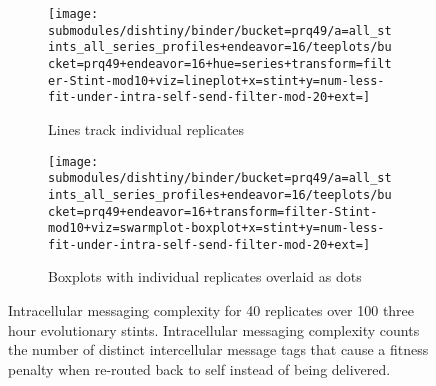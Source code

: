 \begin{figure}
\begin{center}

\begin{subfigure}[b]{\textwidth}
\centering
\texttt{[image: submodules/dishtiny/binder/bucket=prq49/a=all\_stints\_all\_series\_profiles+endeavor=16/teeplots/bucket=prq49+endeavor=16+hue=series+transform=filter-Stint-mod10+viz=lineplot+x=stint+y=num-less-fit-under-intra-self-send-filter-mod-20+ext=]}%
\caption{
Lines track individual replicates
}
\label{fig:intra-messaging-complexity-vs-stint-lineplot}
\end{subfigure}

\begin{subfigure}[b]{\columnwidth}
\centering
\texttt{[image: submodules/dishtiny/binder/bucket=prq49/a=all\_stints\_all\_series\_profiles+endeavor=16/teeplots/bucket=prq49+endeavor=16+transform=filter-Stint-mod10+viz=swarmplot-boxplot+x=stint+y=num-less-fit-under-intra-self-send-filter-mod-20+ext=]}
\caption{
Boxplots with individual replicates overlaid as dots
}
\label{fig:intra-messaging-complexity-vs-stint-boxplot}
\end{subfigure}

\caption{
Intracellular messaging complexity for 40 replicates over 100 three hour evolutionary stints.
Intracellular messaging complexity counts the number of distinct intercellular message tags that cause a fitness penalty when re-routed back to self instead of being delivered.
}
\label{fig:intra-messaging-complexity-vs-stint}

\end{center}
\end{figure}
